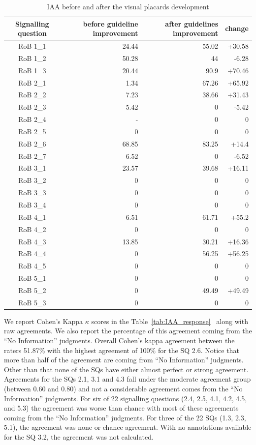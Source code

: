 \documentclass[sn-mathphys,Numbered]{sn-jnl}%
\theoremstyle{thmstyleone}%
\theoremstyle{thmstyletwo}%
\theoremstyle{thmstylethree}%
\begin{document}
\begin{table}[htb]
    \caption{IAA before and after the visual placards development}
    \label{tab:IAA_sq}
    \centering
    \begin{tabular}{crrr}
    \hline
        Signalling question & before guideline improvement & after guidelines improvement & change \\
    \hline
        RoB 1\_1 & 24.44 & 55.02 & +30.58 \\ 
        RoB 1\_2 & 50.28 & 44 & -6.28 \\ 
        RoB 1\_3 & 20.44 & 90.9 & +70.46 \\ 
        RoB 2\_1 & 1.34 & 67.26 & +65.92 \\ 
        RoB 2\_2 & 7.23 & 38.66 & +31.43 \\ 
        RoB 2\_3 & 5.42 & 0 & -5.42 \\ 
        RoB 2\_4 & - & 0 & 0 \\ 
        RoB 2\_5 & 0 & 0 & 0 \\ 
        RoB 2\_6 & 68.85 & 83.25 & +14.4 \\ 
        RoB 2\_7 & 6.52 & 0 & -6.52 \\ 
        RoB 3\_1 & 23.57 & 39.68 & +16.11 \\ 
        RoB 3\_2 & 0 & 0 & 0 \\ 
        RoB 3\_3 & 0 & 0 & 0 \\ 
        RoB 3\_4 & 0 & 0 & 0 \\ 
        RoB 4\_1 & 6.51 & 61.71 & +55.2 \\ 
        RoB 4\_2 & 0 & 0 & 0 \\ 
        RoB 4\_3 & 13.85 & 30.21 & +16.36 \\ 
        RoB 4\_4 & 0 & 56.25 & +56.25 \\ 
        RoB 4\_5 & 0 & 0 & 0 \\ 
        RoB 5\_1 & 0 & 0 & 0 \\ 
        RoB 5\_2 & 0 & 49.49 & +49.49 \\ 
        RoB 5\_3 & 0 & 0 & 0 \\ \hline
    \end{tabular}
\end{table}
%
%
%

We report Cohen's Kappa $\kappa$ scores in the Table~\ref{tab:IAA_response}~\cite{mchugh2012interrater} along with raw agreements.
We also report the percentage of this agreement coming from the ``No Information'' judgments.
Overall Cohen's kappa agreement between the raters 51.87\% with the highest agreement of 100\% for the SQ 2.6.
Notice that more than half of the agreement are coming from ``No Information'' judgments.
Other than that none of the SQs have either almost perfect or strong agreement.
Agreements for the SQs 2.1, 3.1 and 4.3 fall under the moderate agreement group (between 0.60 and 0.80) and not a considerable agreement comes from the ``No Information'' judgments.
For six of 22 signalling questions (2.4, 2.5, 4.1, 4.2, 4.5, and 5.3) the agreement was worse than chance with most of these agreements coming from the ``No Information'' judgments.
For three of the 22 SQs (1.3, 2.3, 5.1), the agreement was none or chance agreement. 
With no annotations available for the SQ 3.2, the agreement was not calculated.
\end{document}
